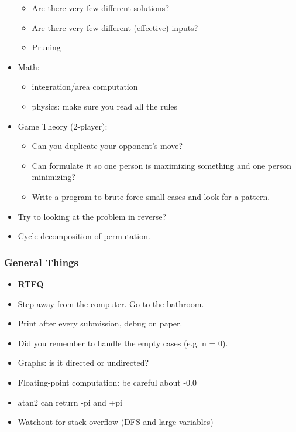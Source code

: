 \documentclass[landscape,10pt]{article}
\begin{document}
\begin{multicols*}{2}
\begin{itemize}
   \begin{itemize}
   \item Are there very few different solutions?
   \item Are there very few different (effective) inputs?
   \item Pruning
   \end{itemize}
 \item Math:
   \begin{itemize}
   \item integration/area computation
   \item physics: make sure you read all the rules
   \end{itemize}
 \item Game Theory (2-player):
  \begin{itemize}
   \item Can you duplicate your opponent's move?
   \item Can formulate it so one person is maximizing something and one person minimizing?
   \item Write a program to brute force small cases and look for a pattern.
   \end{itemize}
 \item Try to looking at the problem in reverse?
 \item Cycle decomposition of permutation.
\end{itemize}

\subsubsection*{General Things}

\begin{itemize}
 \item {\color{red} \textbf{RTFQ} }
 \item Step away from the computer.  Go to the bathroom.
 \item Print after every submission, debug on paper.
 \item Did you remember to handle the empty cases (e.g. n = 0).
 \item Graphs: is it directed or undirected?
 \item Floating-point computation: be careful about -0.0
 \item atan2 can return -pi and +pi
 \item Watchout for stack overflow (DFS and large variables)
\end{itemize}


\end{multicols*}
\end{document}
